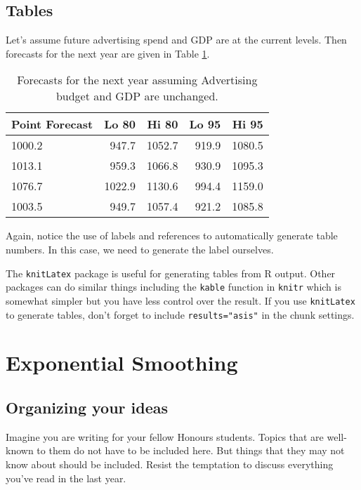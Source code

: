 \documentclass[honours,12pt,twoside]{unswthesis}
\numberwithin{equation}{section}
\begin{document}
\hypertarget{tables}{%
\section{Tables}\label{tables}}

Let's assume future advertising spend and GDP are at the current levels. Then forecasts for the next year are given in Table \ref{tab:salesforecasts}.

\begin{table}[ht]
\begin{center}
\begin{tabular}{lrrrr}
\toprule
Point Forecast & Lo 80 & Hi 80 & Lo 95 & Hi 95 \\
\midrule
1000.2 &  947.7 & 1052.7 & 919.9 & 1080.5 \\
1013.1 &  959.3 & 1066.8 & 930.9 & 1095.3 \\
1076.7 & 1022.9 & 1130.6 & 994.4 & 1159.0 \\
1003.5 &  949.7 & 1057.4 & 921.2 & 1085.8 \\
\bottomrule
\end{tabular}
\caption{Forecasts for the next year assuming Advertising budget and GDP are unchanged.}
\label{tab:salesforecasts}
\end{center}
\end{table}

Again, notice the use of labels and references to automatically generate table numbers. In this case, we need to generate the label ourselves.

The \texttt{knitLatex} package is useful for generating tables from R output. Other packages can do similar things including the \texttt{kable} function in \texttt{knitr} which is somewhat simpler but you have less control over the result. If you use \texttt{knitLatex} to generate tables, don't forget to include \texttt{results="asis"} in the chunk settings.

\hypertarget{sec:expsmooth}{%
\chapter{Exponential Smoothing}\label{sec:expsmooth}}

\hypertarget{organizing-your-ideas}{%
\section{Organizing your ideas}\label{organizing-your-ideas}}

Imagine you are writing for your fellow Honours students. Topics that are well-known to them do not have to be included here. But things that they may not know about should be included. Resist the temptation to discuss everything you've read in the last year.
\end{document}
